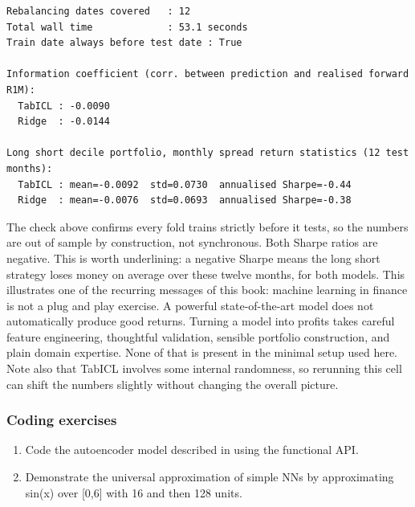 \begin{verbatim}
Rebalancing dates covered   : 12
Total wall time             : 53.1 seconds
Train date always before test date : True

Information coefficient (corr. between prediction and realised forward R1M):
  TabICL : -0.0090
  Ridge  : -0.0144

Long short decile portfolio, monthly spread return statistics (12 test months):
  TabICL : mean=-0.0092  std=0.0730  annualised Sharpe=-0.44
  Ridge  : mean=-0.0076  std=0.0693  annualised Sharpe=-0.38
\end{verbatim}

The check above confirms every fold trains strictly before it tests, so the numbers are out of sample by construction, not synchronous. Both Sharpe ratios are negative. This is worth underlining: a negative Sharpe means the long short strategy loses money on average over these twelve months, for both models. This illustrates one of the recurring messages of this book: machine learning in finance is not a plug and play exercise. A powerful state-of-the-art model does not automatically produce good returns. Turning a model into profits takes careful feature engineering, thoughtful validation, sensible portfolio construction, and plain domain expertise. None of that is present in the minimal setup used here. Note also that TabICL involves some internal randomness, so rerunning this cell can shift the numbers slightly without changing the overall picture.

\subsubsection{Coding exercises}

\begin{enumerate}
\item Code the autoencoder model described in \cite{gu2019autoencoder} using the functional API.
\item Demonstrate the universal approximation of simple NNs by approximating sin(x) over [0,6] with 16 and then 128 units.
\end{enumerate}